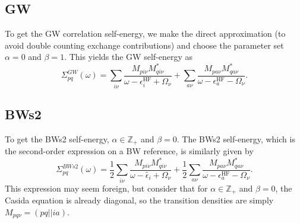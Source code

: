 \subsection{GW}
To get the GW correlation self-energy, we make the direct approximation (to avoid double counting exchange contributions) and choose the parameter set $\alpha=0$ and $\beta=1$. This yields the GW self-energy as
\begin{equation}
\Sigma^{GW}_{pq}(\omega) = \sum_{i \nu} \frac{M_{pi\nu} M_{qi\nu}^*}{\omega - {\epsilon}_i^{\text{HF}} + \Omega_\nu} + \sum_{a \nu} \frac{M_{pa\nu} M_{qa\nu}^*}{\omega - {\epsilon_a^{\text{HF}}} - \Omega_\nu }.
\end{equation}
\subsection{BWs2}
To get the BWs2 self-energy, $\alpha\in\mathbb{Z}_+$ and $\beta=0$. The BWs2 self-energy, which is the second-order expression on a BW reference, is similarly given by
\begin{equation}
\Sigma^{BWs2}_{pq}(\omega) = \frac{1}{2}\sum_{i\nu} \frac{M_{pi\nu} M_{qi\nu}^*}{\omega - \tilde{\epsilon_i} + \Omega_\nu} + \frac{1}{2}\sum_{a\nu} \frac{M_{pa\nu} M_{qa\nu}^*}{\omega - \epsilon_a^{\text{HF}} - \Omega_\nu}.
\end{equation}
This expression may seem foreign, but consider that for $\alpha\in\mathbb{Z}_+$ and $\beta=0$, the Casida equation is already diagonal, so the transition densities are simply $M_{pq\nu}=(pq||ia)$. 
